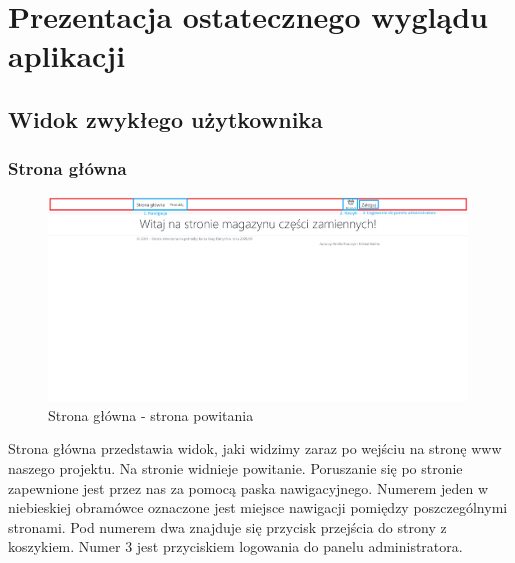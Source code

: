 \documentclass{article}
\begin{document}
\section{Prezentacja ostatecznego wyglądu aplikacji}
\subsection{Widok zwykłego użytkownika}

\subsubsection{Strona główna}
\begin{figure}[H]
   \centering
   \includegraphics[width=0.99\textwidth,frame]{Wyglad/powitanie_uzytkownik.png}
   \caption{Strona główna - strona powitania}
\end{figure}
Strona główna przedstawia widok, jaki widzimy zaraz po wejściu na stronę www naszego projektu.
Na stronie widnieje powitanie. Poruszanie się po stronie zapewnione jest przez nas za pomocą paska
nawigacyjnego. Numerem jeden w niebieskiej obramówce oznaczone jest miejsce nawigacji pomiędzy
poszczególnymi stronami. Pod numerem dwa znajduje się przycisk przejścia do strony z koszykiem.
Numer 3 jest przyciskiem logowania do panelu administratora.
\end{document}
